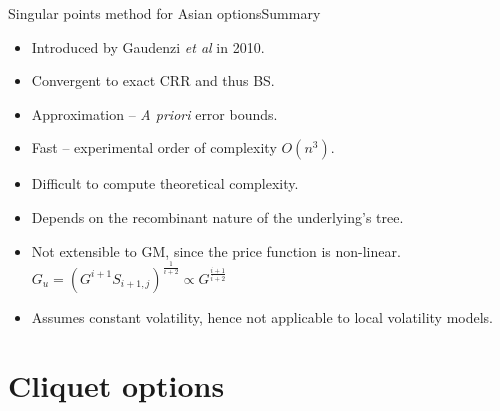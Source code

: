 \documentclass[utf8,t,compress,xcolor=svgnames,handout]{beamer}
\newcommand\pro{\item[\textbf{\CheckedBox}]}
\newcommand\con{\item[\textbf{\XBox}]}
\newcommand\neu{\item[\textbf{\Square}]}
\begin{document}
	
	\begin{frame}{Singular points method for Asian options}{Summary}
		\begin{itemize}
			\neu Introduced by Gaudenzi \emph{et al} \cite{Gaudenzi2010} in 2010.
			\pro Convergent to exact CRR and thus BS.
			\pro Approximation -- \emph{A priori} error bounds.
			\pro Fast -- experimental order of complexity $ O(n^3) $.
			\con Difficult to compute theoretical complexity.
			\con Depends on the recombinant nature of the underlying's tree.
			\con<alert@1-> Not extensible to GM, since the price function is non-linear. $ G_u = \left( G^{i+1} S_{i+1,j} \right)^{\frac{1}{i+2}} \propto G^{\frac{i+1}{i+2}} $
			\con<alert@1-> Assumes constant volatility, hence not applicable to local volatility models.
		\end{itemize}
	\end{frame}
	
	
	
	\section{Cliquet options}
	
\end{document}
